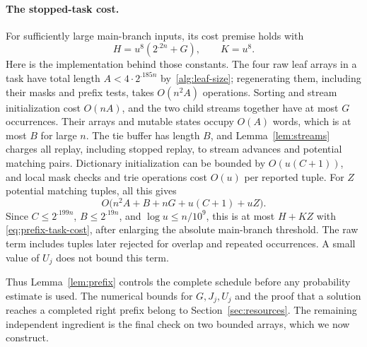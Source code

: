 \paragraph{The stopped-task cost.}
For sufficiently large main-branch inputs, its cost premise holds with
\begin{equation}\label{eq:prefix-task-cost}
 H=u^8(2^{.2n}+G),\qquad K=u^8.
\end{equation}
Here is the implementation behind those constants. The four raw leaf
arrays in a task have total length
$A<4\cdot2^{.185n}$ by~\eqref{alg:leaf-size}; regenerating them,
including their masks and prefix tests, takes $O(n^2A)$ operations.
Sorting and stream initialization cost $O(nA)$, and the two child
streams together have at most $G$ occurrences. Their arrays and
mutable states occupy $O(A)$ words, which is at most $B$ for large
$n$. The tie buffer has length $B$, and Lemma~\ref{lem:streams}
charges all replay, including stopped replay, to stream advances and
potential matching pairs. Dictionary initialization can be bounded by
$O(u(C+1))$, and local mask checks and trie operations cost $O(u)$ per
reported tuple. For $Z$ potential matching tuples, all this gives
\[
 O\bigl(n^2A+B+nG+u(C+1)+uZ\bigr).
\]
Since $C\le2^{.199n}$, $B\le2^{.19n}$, and
$\log u\le n/10^9$, this is at most $H+KZ$ with
\eqref{eq:prefix-task-cost}, after enlarging the absolute main-branch
threshold. The raw term includes tuples later rejected for overlap
and repeated occurrences. A small value of $U_j$ does not bound this
term.

Thus Lemma~\ref{lem:prefix} controls the complete schedule before any
probability estimate is used. The numerical bounds for $G,J_j,U_j$
and the proof that a solution reaches a completed right prefix belong
to Section~\ref{sec:resources}. The remaining independent ingredient
is the final check on two bounded arrays, which we now construct.
